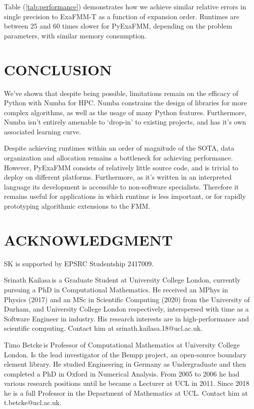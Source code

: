 \documentclass{IEEEcsmag}
\begin{document}
Table (\ref{tab:performance}) demonstrates how we achieve similar relative errors in single precision to ExaFMM-T as a function of expansion order. Runtimes are between 25 and 60 times slower for PyExaFMM, depending on the problem parameters, with similar memory consumption.

\section{CONCLUSION}

We've shown that despite being possible, limitations remain on the efficacy of Python with Numba for HPC. Numba constrains the design of libraries for more complex algorithms, as well as the usage of many Python features. Furthermore, Numba isn't entirely amenable to `drop-in' to existing projects, and has it's own associated learning curve.

Despite achieving runtimes within an order of magnitude of the SOTA, data organization and allocation remains a bottleneck for achieving performance. However, PyExaFMM consists of relatively little source code, and is trivial to deploy on different platforms. Furthermore, as it's written in an interpreted language its development is accessible to non-software specialists. Therefore it remains useful for applications in which runtime is less important, or for rapidly prototyping algorithmic extensions to the FMM.

\section{ACKNOWLEDGMENT}

SK is supported by EPSRC Studentship 2417009.




\begin{IEEEbiography}{Srinath Kailasa}{\,}is a Graduate Student at University College London, currently pursuing a PhD in Computational Mathematics. He received an MPhys in Physics (2017) and an MSc in Scientific Computing (2020) from the University of Durham, and University College London respectively, interspersed with time as a Software Engineer in industry. His research interests are in high-performance and scientific computing. Contact him at srinath.kailasa.18@ucl.ac.uk.
\end{IEEEbiography}

\begin{IEEEbiography}{Timo Betcke}{\,}is Professor of Computational Mathematics at University College London. Is the lead investigator of the Bempp project, an open-source boundary element library. He studied Engineering in Germany as Undergraduate and then completed a PhD in Oxford in Numerical Analysis. From 2005 to 2006 he had various research positions until he became a Lecturer at UCL in 2011. Since 2018 he is a full Professor in the Department of Mathematics at UCL. Contact him at t.betcke@ucl.ac.uk.
\end{IEEEbiography}
\end{document}
